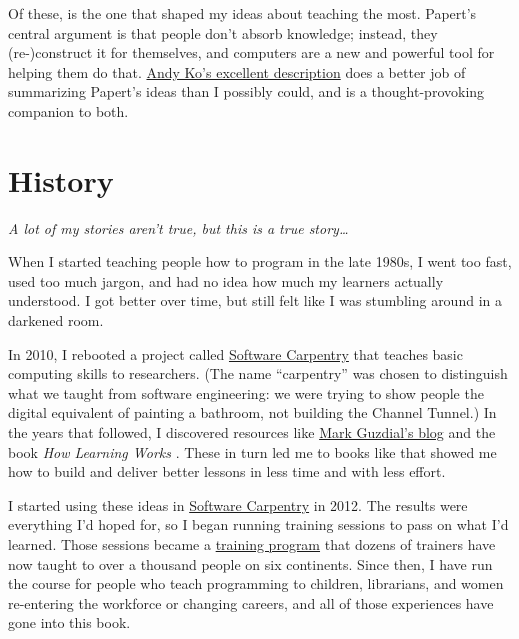 Of these, \cite{Pape1993} is the one that shaped my ideas about
teaching the most.  Papert's central argument is that people don't
absorb knowledge; instead, they (re-)construct it for themselves, and
computers are a new and powerful tool for helping them do that.
\href{https://medium.com/bits-and-behavior/mindstorms-what-did-papert-argue-and-what-does-it-mean-for-learning-and-education-c8324b58aca4}{Andy
  Ko's excellent description} does a better job of summarizing
Papert's ideas than I possibly could, and \cite{Craw2010} is a
thought-provoking companion to both.

\section{History}\label{s:intro-history}

\emph{A lot of my stories aren't true, but this is a true
  story{\ldots}}

When I started teaching people how to program in the late 1980s, I
went too fast, used too much jargon, and had no idea how much my
learners actually understood.  I got better over time, but still felt
like I was stumbling around in a darkened room.

In 2010, I rebooted a project called
\href{http://carpentries.org}{Software Carpentry} that teaches basic
computing skills to researchers.  (The name ``carpentry'' was chosen
to distinguish what we taught from software engineering: we were
trying to show people the digital equivalent of painting a bathroom,
not building the Channel Tunnel.)  In the years that followed, I
discovered resources like \href{http://computinged.wordpress.com}{Mark
  Guzdial's blog} and the book \emph{How Learning Works}
\cite{Ambr2010}. These in turn led me to books like
\cite{Hust2012,Lemo2014,Lang2016} that showed me how to build and
deliver better lessons in less time and with less effort.

I started using these ideas in \href{http://carpentries.org}{Software
  Carpentry} in 2012.  The results were everything I'd hoped for, so I
began running training sessions to pass on what I'd learned.  Those
sessions became a
\href{https://carpentries.github.io/instructor-training/}{training
  program} that dozens of trainers have now taught to over a thousand
people on six continents.  Since then, I have run the course for
people who teach programming to children, librarians, and women
re-entering the workforce or changing careers, and all of those
experiences have gone into this book.

